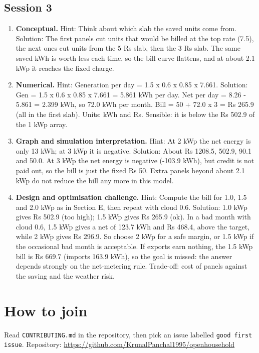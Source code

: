\documentclass[11pt,a4paper]{article}
\begin{document}
\subsection*{Session 3}
\begin{enumerate}[nosep]
\item \textbf{Conceptual.} Hint: Think about which slab the saved units come from. Solution: The first panels cut units that would be billed at the top rate (7.5), the next ones cut units from the 5 Rs slab, then the 3 Rs slab. The same saved kWh is worth less each time, so the bill curve flattens, and at about 2.1 kWp it reaches the fixed charge.
\item \textbf{Numerical.} Hint: Generation per day = 1.5 x 0.6 x 0.85 x 7.661. Solution: Gen = 1.5 x 0.6 x 0.85 x 7.661 = 5.861 kWh per day. Net per day = 8.26 - 5.861 = 2.399 kWh, so 72.0 kWh per month. Bill = 50 + 72.0 x 3 = Rs 265.9 (all in the first slab). Units: kWh and Rs. Sensible: it is below the Rs 502.9 of the 1 kWp array.
\item \textbf{Graph and simulation interpretation.} Hint: At 2 kWp the net energy is only 13 kWh; at 3 kWp it is negative. Solution: About Rs 1208.5, 502.9, 90.1 and 50.0. At 3 kWp the net energy is negative (-103.9 kWh), but credit is not paid out, so the bill is just the fixed Rs 50. Extra panels beyond about 2.1 kWp do not reduce the bill any more in this model.
\item \textbf{Design and optimisation challenge.} Hint: Compute the bill for 1.0, 1.5 and 2.0 kWp as in Section E, then repeat with cloud 0.6. Solution: 1.0 kWp gives Rs 502.9 (too high); 1.5 kWp gives Rs 265.9 (ok). In a bad month with cloud 0.6, 1.5 kWp gives a net of 123.7 kWh and Rs 468.4, above the target, while 2 kWp gives Rs 296.9. So choose 2 kWp for a safe margin, or 1.5 kWp if the occasional bad month is acceptable. If exports earn nothing, the 1.5 kWp bill is Rs 669.7 (imports 163.9 kWh), so the goal is missed: the answer depends strongly on the net-metering rule. Trade-off: cost of panels against the saving and the weather risk.
\end{enumerate}

\section{How to join}
Read \texttt{CONTRIBUTING.md} in the repository, then pick an issue labelled \texttt{good first issue}. Repository: \url{https://github.com/KrunalPanchal1995/openhousehold}
\end{document}
